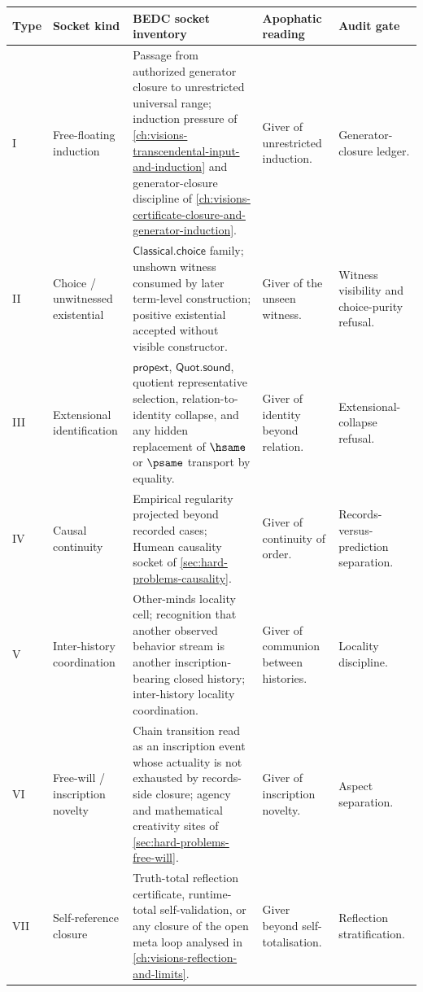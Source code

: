 \begin{longtable}{p{}p{}p{}p{}p{}}
\toprule
\textbf{Type} & \textbf{Socket kind} & \textbf{BEDC socket inventory} & \textbf{Apophatic reading} & \textbf{Audit gate} \\
\midrule
I & Free-floating induction & Passage from authorized generator closure to unrestricted universal range; induction pressure of \autoref{ch:visions-transcendental-input-and-induction} and generator-closure discipline of \autoref{ch:visions-certificate-closure-and-generator-induction}. & Giver of unrestricted induction. & Generator-closure ledger. \\
II & Choice / unwitnessed existential & $\mathsf{Classical.choice}$ family; unshown witness consumed by later term-level construction; positive existential accepted without visible constructor. & Giver of the unseen witness. & Witness visibility and choice-purity refusal. \\
III & Extensional identification & $\mathsf{propext}$, $\mathsf{Quot.sound}$, quotient representative selection, relation-to-identity collapse, and any hidden replacement of $\hsame$ or $\psame$ transport by equality. & Giver of identity beyond relation. & Extensional-collapse refusal. \\
IV & Causal continuity & Empirical regularity projected beyond recorded cases; Humean causality socket of \autoref{sec:hard-problems-causality}. & Giver of continuity of order. & Records-versus-prediction separation. \\
V & Inter-history coordination & Other-minds locality cell; recognition that another observed behavior stream is another inscription-bearing closed history; inter-history locality coordination. & Giver of communion between histories. & Locality discipline. \\
VI & Free-will / inscription novelty & Chain transition read as an inscription event whose actuality is not exhausted by records-side closure; agency and mathematical creativity sites of \autoref{sec:hard-problems-free-will}. & Giver of inscription novelty. & Aspect separation. \\
VII & Self-reference closure & Truth-total reflection certificate, runtime-total self-validation, or any closure of the open meta loop analysed in \autoref{ch:visions-reflection-and-limits}. & Giver beyond self-totalisation. & Reflection stratification. \\
\bottomrule
\end{longtable}

